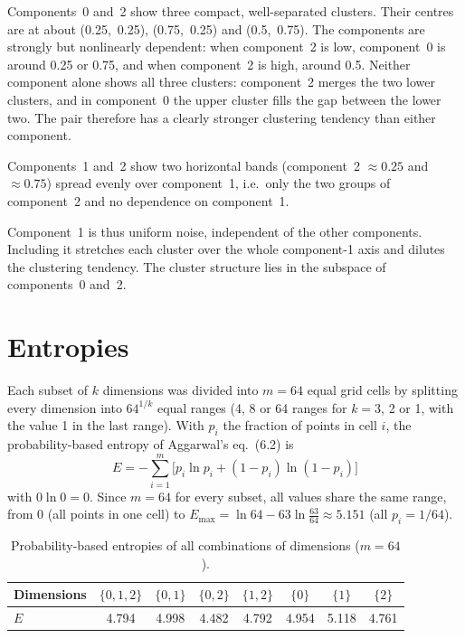\documentclass[a4paper,12pt]{article}
\begin{document}
Components~0 and~2 show three compact, well-separated clusters. Their
centres are at about (0.25,~0.25), (0.75,~0.25) and (0.5,~0.75). The components are
strongly but nonlinearly dependent: when component~2 is low, component~0 is
around 0.25 or 0.75, and when component~2 is high, around 0.5. Neither
component alone shows all three clusters: component~2 merges the two lower
clusters, and in component~0 the upper cluster fills the gap between the
lower two. The pair therefore has a clearly stronger clustering tendency
than either component.

Components~1 and~2 show two horizontal bands (component~2 $\approx0.25$ and
$\approx0.75$) spread evenly over component~1, i.e.\ only the two groups of
component~2 and no dependence on component~1.

Component~1 is thus uniform noise, independent of the other components.
Including it stretches each cluster over the whole component-1 axis and
dilutes the clustering tendency. The cluster structure lies in the subspace
of components~0 and~2.

\section{Entropies}

Each subset of $k$ dimensions was divided into $m=64$ equal grid cells by
splitting every dimension into $64^{1/k}$ equal ranges (4, 8 or 64 ranges
for $k=3$, 2 or 1, with the value 1 in the last range). With $p_i$ the
fraction of points in cell $i$, the probability-based entropy of Aggarwal's
eq.~(6.2) is
\[
  E=-\sum_{i=1}^{m}\bigl[p_i\ln p_i+(1-p_i)\ln(1-p_i)\bigr]
\]
with $0\ln0=0$. Since $m=64$ for every subset, all values share the same
range, from 0 (all points in one cell) to
$E_{\max}=\ln64-63\ln\frac{63}{64}\approx5.151$ (all $p_i=1/64$).

\begin{table}[!ht]
\centering
\caption{Probability-based entropies of all combinations of dimensions ($m=64$).}
\label{tab:entropies}
\begin{tabular}{lccccccc}
\toprule
Dimensions & $\{0,1,2\}$ & $\{0,1\}$ & $\{0,2\}$ & $\{1,2\}$ & $\{0\}$ & $\{1\}$ & $\{2\}$ \\
\midrule
$E$ & 4.794 & 4.998 & 4.482 & 4.792 & 4.954 & 5.118 & 4.761 \\
\bottomrule
\end{tabular}
\end{table}
\end{document}
